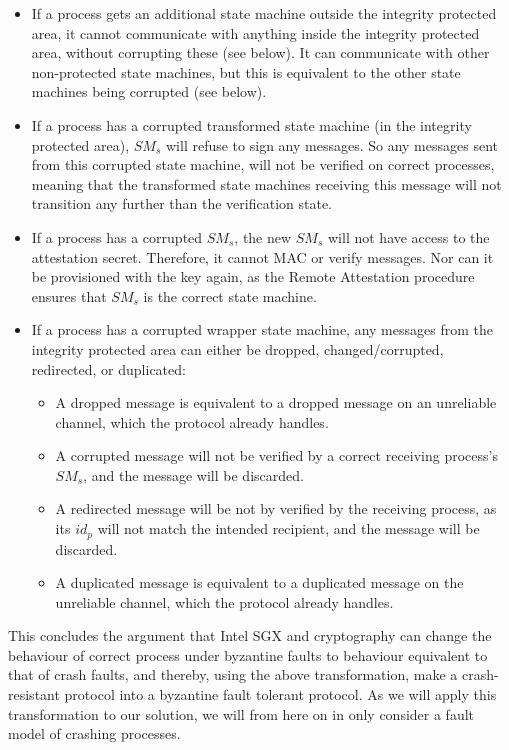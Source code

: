 \documentclass{article}
\begin{document}
\begin{itemize}
		\item If a process gets an additional state machine outside the integrity protected area, it cannot communicate with anything inside the integrity protected area, without corrupting these (see below).
		It can communicate with other non-protected state machines, but this is equivalent to the other state machines being corrupted (see below).
		\item If a process has a corrupted transformed state machine (in the integrity protected area), $SM_s$ will refuse to sign any messages.
		So any messages sent from this corrupted state machine, will not be verified on correct processes, meaning that the transformed state machines receiving this message will not transition any further than the verification state.
		\item If a process has a corrupted $SM_s$, the new $SM_s$ will not have access to the attestation secret.
		Therefore, it cannot MAC or verify messages.
		Nor can it be provisioned with the key again, as the Remote Attestation procedure ensures that $SM_s$ is the correct state machine.
		\item If a process has a corrupted wrapper state machine, any messages from the integrity protected area can either be dropped, changed/corrupted, redirected, or duplicated:
		\begin{itemize}
			\item A dropped message is equivalent to a dropped message on an unreliable channel, which the protocol already handles.
			\item A corrupted message will not be verified by a correct receiving process's $SM_s$, and the message will be discarded.
			\item A redirected message will be not by verified by the receiving process, as its $id_p$ will not match the intended recipient, and the message will be discarded.
			\item A duplicated message is equivalent to a duplicated message on the unreliable channel, which the protocol already handles.
		\end{itemize}
	\end{itemize}

	This concludes the argument that Intel SGX and cryptography can change the behaviour of correct process under byzantine faults to behaviour equivalent to that of crash faults, and thereby, using the above transformation, make a crash-resistant protocol into a byzantine fault tolerant protocol.
	As we will apply this transformation to our solution, we will from here on in only consider a fault model of crashing processes.
\end{document}
